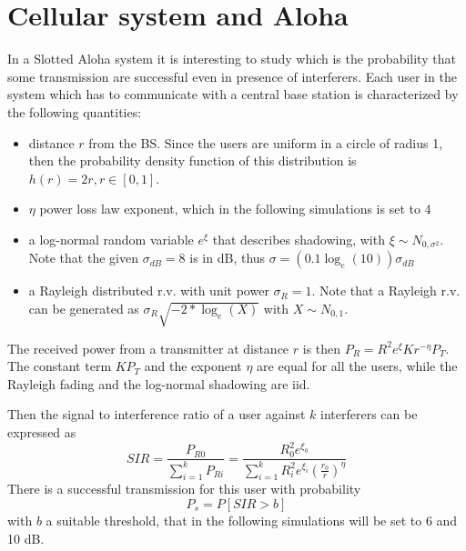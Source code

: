 \documentclass[10pt]{article}
\begin{document}
\section*{Cellular system and Aloha}
In a Slotted Aloha system it is interesting to study which is the probability that some transmission are successful even in presence of interferers. 
Each user in the system which has to communicate with a central base station is characterized by the following quantities:
\begin{itemize}
\item distance $r$ from the BS. Since the users are uniform in a circle of radius 1, then the probability density function of this distribution is $h(r) = 2r, r \in [0,1]$.
\item $\eta$ power loss law exponent, which in the following simulations is set to 4
\item a log-normal random variable $e^{\xi}$ that describes shadowing, with $\xi \sim N_{0,\sigma^2}$. Note that the given $\sigma_{dB}= 8$ is in dB, thus $\sigma = (0.1 \log_e(10))\sigma_{dB}$
\item a Rayleigh distributed r.v. with unit power $\sigma_R = 1$. Note that a Rayleigh r.v. can be generated as $\sigma_R \sqrt{-2*\log_e(X)}$ with $X \sim N_{0,1}$.
\end{itemize}
The received power from a transmitter at distance $r$ is then $P_R = R^2 e^{\xi} K r^{-\eta} P_T$. The constant term $K P_T$ and the exponent $\eta$ are equal for all the users, while the Rayleigh fading and the log-normal shadowing are iid. 

Then the signal to interference ratio of a user against $k$ interferers can be expressed as
\begin{equation}
  SIR = \frac{P_{R0}}{\sum_{i=1}^{k} P_{Ri}} = \frac{R_0^2 e^{\xi_0}}{\sum_{i = 1}^{k}R_i^2 e^{\xi_i}\left(\frac{r_0}{r}\right)^{\eta}}
\end{equation}
There is a successful transmission for this user with probability 
\begin{equation}
  P_s = P[SIR > b]
  \label{eq:ps}
\end{equation}
with $b$ a suitable threshold, that in the following simulations will be set to 6 and 10 dB. 
\end{document}
